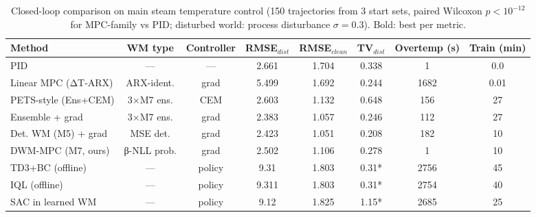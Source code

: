 \begin{table}[t]
\centering\small
\caption{Closed-loop comparison on main steam temperature control (150 trajectories from 3 start sets, paired Wilcoxon $p<10^{-12}$ for MPC-family vs PID; disturbed world: process disturbance $\sigma=0.3$). Bold: best per metric.}
\label{tab:baseline}
\begin{tabular}{lccc cccc}
\toprule
Method & WM type & Controller & RMSE$_{dist}$ & RMSE$_{clean}$ & TV$_{dist}$ & Overtemp (s) & Train (min)\\
\midrule
PID & — & — & 2.661 & 1.704 & 0.338 & 1 & 0.0 \\
Linear MPC (ΔT-ARX) & ARX-ident. & grad & 5.499 & 1.692 & 0.244 & 1682 & 0.01 \\
PETS-style (Ens+CEM) & 3×M7 ens. & CEM & 2.603 & 1.132 & 0.648 & 156 & 27 \\
Ensemble + grad & 3×M7 ens. & grad & 2.383 & 1.057 & 0.246 & 112 & 27 \\
Det. WM (M5) + grad & MSE det. & grad & 2.423 & 1.051 & 0.208 & 182 & 10 \\
DWM-MPC (M7, ours) & β-NLL prob. & grad & 2.502 & 1.106 & 0.278 & 1 & 10 \\
TD3+BC (offline) & — & policy & 9.31 & 1.803 & 0.31* & 2756 & 45 \\
IQL (offline) & — & policy & 9.311 & 1.803 & 0.31* & 2754 & 40 \\
SAC in learned WM & — & policy & 9.12 & 1.825 & 1.15* & 2685 & 25 \\
\bottomrule
\end{tabular}
\end{table}

